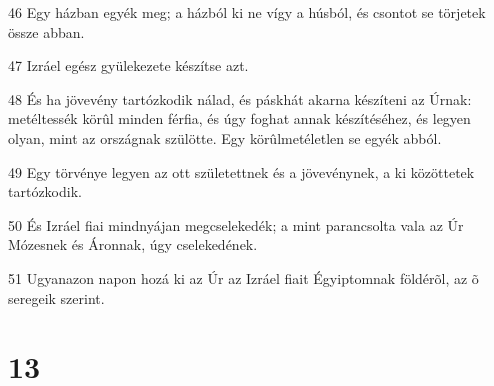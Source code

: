 \par 46 Egy házban egyék meg; a házból ki ne vígy a húsból, és csontot se törjetek össze abban.
\par 47 Izráel egész gyülekezete készítse azt.
\par 48 És ha jövevény tartózkodik nálad, és páskhát akarna készíteni az Úrnak: metéltessék körûl minden férfia, és úgy foghat annak készítéséhez, és legyen olyan, mint az országnak szülötte. Egy körûlmetéletlen se egyék abból.
\par 49 Egy törvénye legyen az ott születettnek és a jövevénynek, a ki közöttetek tartózkodik.
\par 50 És Izráel fiai mindnyájan megcselekedék; a mint parancsolta vala az Úr Mózesnek és Áronnak, úgy cselekedének.
\par 51 Ugyanazon napon hozá ki az Úr az Izráel fiait Égyiptomnak földérõl, az õ seregeik szerint.

\chapter{13}

